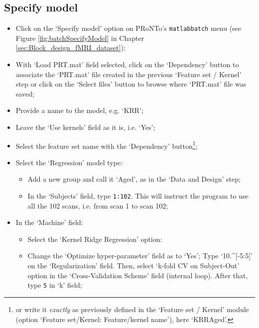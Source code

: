 
\subsection{Specify model}

\begin{itemize}

\item Click on the `Specify model' option on PRoNTo's {\tt matlabbatch} menu (see Figure \ref{fig:batchSpecifyModel} in Chapter \ref{sec:Block_design_fMRI_dataset});
	
\item With `Load PRT.mat' field selected, click on the `Dependency' button to associate the `PRT.mat' file created in the previous `Feature set / Kernel' step or click on the `Select files' button to browse where `PRT.mat' file was saved;

\item Provide a name to the model, e.g. `KRR';   

\item Leave the `Use kernels' field as it is, i.e. `Yes';    

\item Select the feature set name with the `Dependency' button\footnote{or write it {\it exactly} as previously defined in the `Feature set / Kernel' module (option `Feature set/Kernel: Feature/kernel name'), here `KRRAged'.};    
    
\item Select the `Regression' model type:
	
		\begin{itemize}
		
    		\item Add a new group and call it `Aged', as in the `Data and Design' step;
		
		   \item In the `Subjects' field, type {\tt 1:102}. This will instruct the program to use all the 102 scans, i.e. from scan 1 to scan 102;
		    \end{itemize}		
		
	\item In the `Machine' field:
	
	\begin{itemize}
   \item Select the `Kernel Ridge Regression' option:
	
	\item Change the `Optimize hyper-parameter' field as to `Yes'; Type `10.\textasciicircum{}[-5:5]' on the `Regularization' field. Then, select `k-fold CV on Subject-Out' option in the `Cross-Validation Scheme' field (internal loop). After that, type {\tt 5} in `k' field;
		

\end{itemize}
\end{itemize}
